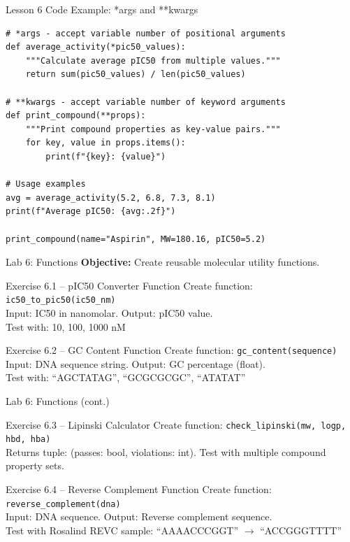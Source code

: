 \documentclass{beamer}
\begin{document}
\begin{frame}[fragile]{Lesson 6 Code Example: *args and **kwargs}
    \small
    \begin{lstlisting}[style=codeStyle]
# *args - accept variable number of positional arguments
def average_activity(*pic50_values):
    """Calculate average pIC50 from multiple values."""
    return sum(pic50_values) / len(pic50_values)

# **kwargs - accept variable number of keyword arguments
def print_compound(**props):
    """Print compound properties as key-value pairs."""
    for key, value in props.items():
        print(f"{key}: {value}")

# Usage examples
avg = average_activity(5.2, 6.8, 7.3, 8.1)
print(f"Average pIC50: {avg:.2f}")

print_compound(name="Aspirin", MW=180.16, pIC50=5.2)
    \end{lstlisting}
\end{frame}

\begin{frame}{\textcolor{labcolor}{Lab 6: Functions}}
    \footnotesize
    \textbf{Objective:} Create reusable molecular utility functions.
    \vspace{0.2em}
    \begin{block}{Exercise 6.1 -- pIC50 Converter Function}
        Create function: \texttt{ic50\_to\_pic50(ic50\_nm)}\\
        Input: IC50 in nanomolar. Output: pIC50 value.\\
        Test with: 10, 100, 1000 nM
    \end{block}
    \vspace{0.2em}
    \begin{block}{Exercise 6.2 -- GC Content Function}
        Create function: \texttt{gc\_content(sequence)}\\
        Input: DNA sequence string. Output: GC percentage (float).\\
        Test with: ``AGCTATAG'', ``GCGCGCGC'', ``ATATAT''
    \end{block}
\end{frame}

\begin{frame}{\textcolor{labcolor}{Lab 6: Functions (cont.)}}
    \footnotesize
    \begin{block}{Exercise 6.3 -- Lipinski Calculator}
        Create function: \texttt{check\_lipinski(mw, logp, hbd, hba)}\\
        Returns tuple: (passes: bool, violations: int). Test with multiple compound property sets.
    \end{block}
    \vspace{0.2em}
    \begin{block}{Exercise 6.4 -- Reverse Complement Function}
        Create function: \texttt{reverse\_complement(dna)}\\
        Input: DNA sequence. Output: Reverse complement sequence.\\
        Test with Rosalind REVC sample: ``AAAACCCGGT'' $\to$ ``ACCGGGTTTT''
    \end{block}
\end{frame}
\end{document}
